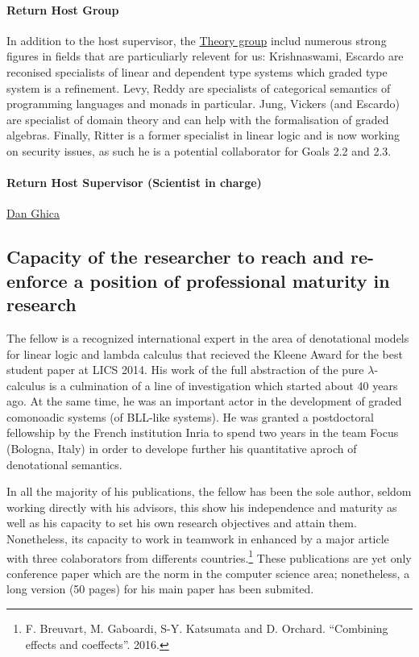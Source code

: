 \documentclass{article}[11pt]
\begin{document}
\paragraph{Return Host Group}
In addition to the host supervisor, the \href{http://www.cs.bham.ac.uk/research/groupings/theory/}{Theory group} includ numerous strong figures in fields that are particuliarly relevent for us: Krishnaswami, Escardo are reconised specialists of linear and dependent type systems which graded type system is a refinement. Levy, Reddy are specialists of categorical semantics of programming languages and monads in particular. Jung, Vickers (and Escardo) are specialist of domain theory and can help with the formalisation of graded algebras. Finally,  Ritter is a former specialist in linear logic and is now working on security issues, as such he is a potential collaborator for Goals 2.2 and 2.3. 

\paragraph{Return Host Supervisor (Scientist in charge)}
\href{http://www.cs.bham.ac.uk/~drg/}{Dan Ghica} 


\subsection{Capacity of the researcher to reach and re-enforce a position of professional maturity in research}

The fellow is a recognized international expert in the area of denotational models for linear logic and lambda calculus that recieved the Kleene Award for the best student paper at LICS 2014. His work of the full abstraction of the pure $\lambda$-calculus is a culmination of a line of investigation which started about 40 years ago. At the same time, he was an important actor in the development of graded comonoadic systems (of BLL-like systems). He was granted a postdoctoral fellowship by the French institution Inria to spend two years in the team Focus (Bologna, Italy) in order to develope further his quantitative aproch of denotational semantics.

In all the majority of his publications, the fellow has been the sole author, seldom working directly with his advisors, this show his independence and maturity as well as his capacity to set his own research objectives and attain them. Nonetheless, its capacity to work in teamwork in enhanced by a major article with three colaborators from differents countries.\footnote{F. Breuvart, M. Gaboardi, S-Y. Katsumata and D. Orchard. ``Combining effects and coeffects''. 2016.} These publications are yet only conference paper which are the norm in the computer science area; nonetheless, a long version (50 pages) for his main paper has been submited.
\end{document}
